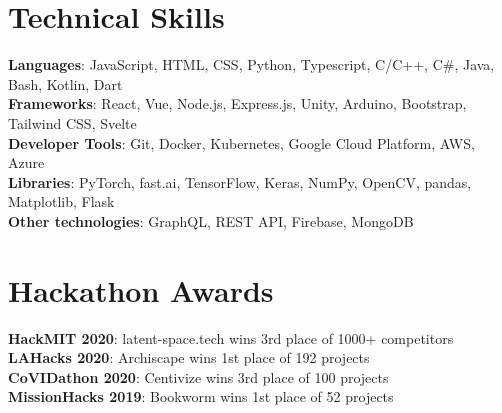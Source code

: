 \documentclass[letterpaper,11pt]{article}
\begin{document}
%
\section{Technical Skills}
\begin{itemize}[leftmargin=0.15in, label={}]
  \small{\item{
                \textbf{Languages}{: JavaScript, HTML, CSS, Python, Typescript, C/C++, C\#, Java, Bash, Kotlin, Dart} \\
                \textbf{Frameworks}{: React, Vue, Node.js, Express.js, Unity, Arduino, Bootstrap, Tailwind CSS, Svelte} \\
                \textbf{Developer Tools}{: Git, Docker, Kubernetes, Google Cloud Platform, AWS, Azure} \\
                \textbf{Libraries}{: PyTorch, fast.ai, TensorFlow, Keras, NumPy, OpenCV, pandas, Matplotlib, Flask} \\
                \textbf{Other technologies}{: GraphQL, REST API, Firebase, MongoDB}
          }}
\end{itemize}


\section{Hackathon Awards}
\begin{itemize}[leftmargin=0.15in, label={}]
  \small{\item{
                \textbf{HackMIT 2020}{: latent-space.tech wins 3rd place of 1000+ competitors} \\
                \textbf{LAHacks 2020}{: Archiscape wins 1st place of 192 projects} \\
                \textbf{CoVIDathon 2020}{: Centivize wins 3rd place of 100 projects} \\
                \textbf{MissionHacks 2019}{: Bookworm wins 1st place of 52 projects} \\
          }}
\end{itemize}
\end{document}
